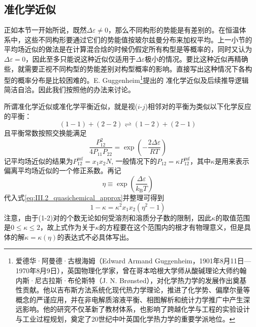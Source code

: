 \documentclass[main.tex]{subfiles}
\begin{document}
\subsection{准化学近似}
正如本节一开始所说，既然$\Delta\varepsilon\neq 0$，那么不同构形的势能是有差别的。在恒温体系中，这些不同构形要通过它们的势能值按玻尔兹曼分布来加权平均。上一小节的平均场近似的做法是在计算混合焓的时候仍假定所有构型是等概率的，同时又认为$\Delta\varepsilon=0$，因此至多只能说这种近似仅适用于$\Delta\varepsilon$极小的情况。要比这种近似再精确些，就需要正视不同构型的势能差别对构型概率的影响。直接写出这种情况下各构型的概率分布是比较困难的。E. Guggenheim\footnote{爱德华·阿曼德·古根海姆（Edward Armand Guggenheim，1901年8月11日---1970年8月9日），英国物理化学家，曾在哥本哈根大学师从酸碱理论大师约翰内斯·尼古拉斯·布伦斯特（J. N. Brønsted），对化学热力学的发展作出奠基性贡献。他以吉布斯方法系统化现代热力学理论，推进了化学势、偏摩尔量等概念的严谨应用，并在非电解质溶液平衡、相图解析和统计力学推广中产生深远影响。他的研究不仅革新了教材体系，也影响了跨越化学与工程的实验设计与工业过程规划，奠定了20世纪中叶英国化学热力学的重要学派地位。}提出的
准化学近似及后续推导逻辑简洁自洽。因此我们按照他的办法来讨论。

所谓准化学近似或准化学平衡近似，就是视($i$-$j$)相邻对的平衡为类似以下化学反应的平衡：
\[(1-1)+(2-2)\rightleftharpoons(1-2)+(2-1)\]
且平衡常数按照交换能满足
\begin{equation}\label{eq:III.2_quasichemical_approx}
  \frac{P_{12}^2}{4P_{11}P_{22}}=\exp\left(-\frac{2\Delta\varepsilon}{RT}\right)
\end{equation}
记平均场近似的结果为$P^\text{mf}_{12}=x_1x_2N$, 一般情况下的$P_{12}=\kappa P^\text{mf}_{12}$，其中$\kappa$是用来表示偏离平均场近似的一个修正系数。再记
\[\eta\equiv\exp\left(\frac{\Delta\varepsilon}{k_\text{B}T}\right)\]
代入式\eqref{eq:III.2_quasichemical_approx}并整理可得到
\begin{equation}\label{eq:III.2_kappa_eta_relation}
  1-\kappa=\kappa^2x_1x_2\left(\eta^2-1\right)
\end{equation}
注意，由于(1-2)对的个数无论如何受溶剂和溶质分子数的限制，因此$\kappa$的取值范围是$0\leq\kappa\leq 2$，故上式作为关于$\kappa$的方程要在这个范围内的根才有物理意义，但是具体的解$\kappa=\kappa\left(\eta\right)$的表达式不必具体写出。
\end{document}

